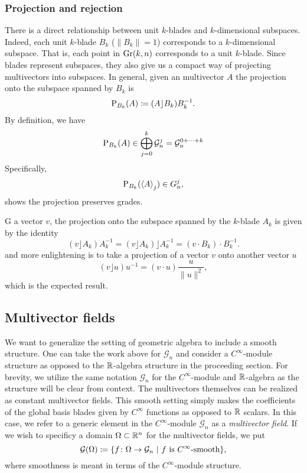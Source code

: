 \subsubsection{Projection and rejection}

There is a direct relationship between unit $k$-blades and $k$-dimensional subspaces.  Indeed, each unit $k$-blade $B_k$ ($\|B_k\|=1$) corresponds to a $k$-dimensional subspace.  That is, each point in $\Grassmannian{k}{n}$ corresponds to a unit $k$-blade.  Since blades represent subspaces, they also give us a compact way of projecting multivectors into subspaces.  In general, given an multivector $A$ the projection onto the subspace spanned by $B_k$ is
\begin{equation}
\label{eq:projection}
\projection{B_k}{A} \coloneqq (A\rfloor B_k)B_k^{-1}.
\end{equation}
By definition, we have
\[
\projection{B_k}{A} \in \bigoplus_{j=0}^k \G_n^j = \G_n^{0+\cdots + k}
\]
Specifically,
\[
\projection{B_k}{\proj{j}{A}} \in G_n^j,
\]
shows the projection preserves grades.

G a vector $v$, the projection onto the subspace spanned by the $k$-blade $A_k$ is given by the identity
\begin{equation}
\label{eq:vector_projection}
(v\rfloor A_k )A_k^{-1} = (v\rfloor A_k)\rfloor A_k^{-1} = (v\cdot B_k)\cdot B_k^{-1}.
\end{equation}
and more enlightening is to take a projection of a vector $v$ onto another vector $u$
\[
(v\rfloor u)u^{-1} = (v \cdot u) \frac{u}{\|u\|^2},
\]
which is the expected result. 



\subsection{Multivector fields}

We want to generalize the setting of geometric algebra to include a smooth structure. One can take the work above for $\mathcal{G}_n$ and consider a $C^{\infty}$-module structure as opposed to the $\R$-algebra structure in the proceeding section. For brevity, we utilize the same notation $\mathcal{G}_n$ for the $C^\infty$-module and $\R$-algebra as the structure will be clear from context. The multivectors themselves can be realized as constant multivector fields. This smooth setting simply makes the coefficients of the global basis blades given by $C^\infty$ functions as opposed to $\R$ scalars.  In this case, we refer to a generic element in the $C^{\infty}$-module $\mathcal{G}_n$ as a \emph{multivector field}. If we wish to specificy a domain $\Omega \subset \R^n$ for the multivector fields, we put
\[
\multivectorfieldson{\Omega} \coloneqq \{ f \colon \Omega \to \G_n ~\vert~ \textrm{$f$ is $C^\infty$-smooth}\},
\]
where smoothness is meant in terms of the $C^\infty$-module structure.

